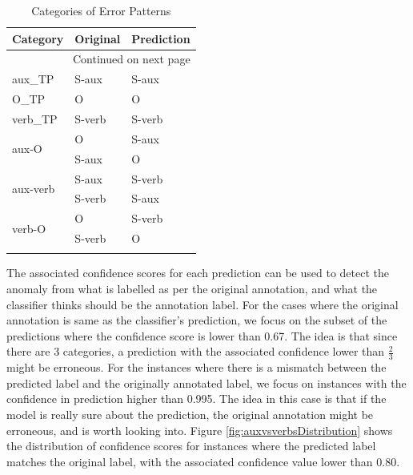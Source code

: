 \begin{longtable}{|l|l|l|}
\hline 
\multicolumn{1}{|l|}{\textbf{Category}} &
\multicolumn{1}{l|}{\textbf{Original}} &
\multicolumn{1}{l|}{\textbf{Prediction}} \\
\hline 
\endhead
\hline 
\multicolumn{3}{|r|}{{Continued on next page}} \\ 
\hline
\endfoot
\endlastfoot
    \hline
    \label{tab:auxverbCategories}
    aux\_TP & S-aux & S-aux \\
    O\_TP & O & O \\
    verb\_TP & S-verb & S-verb \\
    \hline
    \hline
    \multirow{2}{*}{aux-O} & O & S-aux \\
    & S-aux & O \\
    \hline
    \multirow{2}{*}{aux-verb} & S-aux & S-verb \\
    & S-verb & S-aux \\
    \hline
    \multirow{2}{*}{verb-O} & O & S-verb \\
    & S-verb & O \\
    \hline
    \caption{Categories of Error Patterns}
\end{longtable}

The associated confidence scores for each prediction can be used to detect the anomaly from what is labelled as per the original annotation, and what the classifier thinks should be the annotation label. For the cases where the original annotation is same as the classifier's prediction, we focus on the subset of the predictions where the confidence score is lower than 0.67. The idea is that since there are 3 categories, a prediction with the associated confidence lower than \(\frac{2}{3}\) might be erroneous. For the instances where there is a mismatch between the predicted label and the originally annotated label, we focus on instances with the confidence in prediction higher than 0.995. The idea in this case is that if the model is really sure about the prediction, the original annotation might be erroneous, and is worth looking into. Figure \ref{fig:auxvsverbsDistribution} shows the distribution of confidence scores for instances where the predicted label matches the original label, with the associated confidence value lower than 0.80. 

